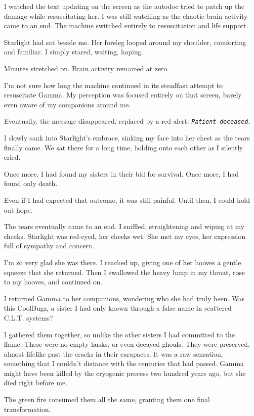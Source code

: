 I watched the text updating on the screen as the autodoc tried to patch up the damage while resuscitating her. I was still watching as the chaotic brain activity came to an end. The machine switched entirely to resuscitation and life support.

Starlight had sat beside me. Her foreleg looped around my shoulder, comforting and familiar. I simply stared, waiting, hoping.

Minutes stretched on. Brain activity remained at zero.

I’m not sure how long the machine continued in its steadfast attempt to resuscitate Gamma. My perception was focused entirely on that screen, barely even aware of my companions around me.

Eventually, the message disappeared, replaced by a red alert: \textit{\texttt{Patient deceased}}.

I slowly sank into Starlight’s embrace, sinking my face into her chest as the tears finally came. We sat there for a long time, holding onto each other as I silently cried.

Once more, I had found my sisters in their bid for survival. Once more, I had found only death.

Even if I had expected that outcome, it was still painful. Until then, I could hold out hope.

The tears eventually came to an end. I sniffled, straightening and wiping at my cheeks. Starlight was red-eyed, her cheeks wet. She met my eyes, her expression full of sympathy and concern.

I’m so very glad she was there. I reached up, giving one of her hooves a gentle squeeze that she returned. Then I swallowed the heavy lump in my throat, rose to my hooves, and continued on.

I returned Gamma to her companions, wondering who she had truly been. Was this CoolBugz, a sister I had only known through a false name in scattered C.L.T. systems?

I gathered them together, so unlike the other sisters I had committed to the flame. These were no empty husks, or even decayed ghouls. They were preserved, almost lifelike past the cracks in their carapaces. It was a raw sensation, something that I couldn’t distance with the centuries that had passed. Gamma might have been killed by the cryogenic process two hundred years ago, but she died right before me.

The green fire consumed them all the same, granting them one final transformation.

